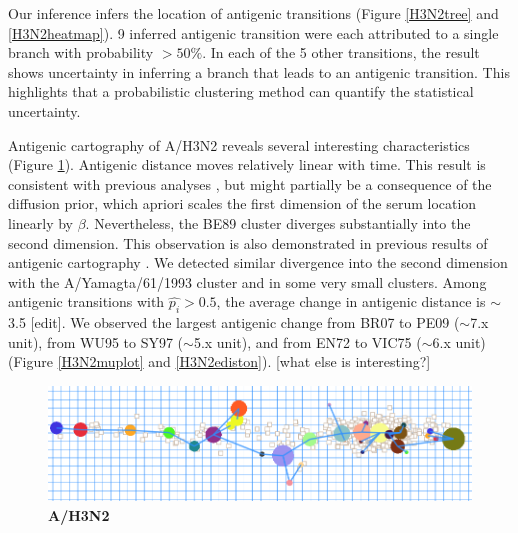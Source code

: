\documentclass[11pt,oneside,letterpaper]{article}
\begin{document}
Our inference infers the location of antigenic transitions (Figure \ref{H3N2tree} and \ref{H3N2heatmap}). 
9 inferred antigenic transition were each attributed to a single branch with probability $>50\%$. In each of the 5 other transitions, the result shows uncertainty in inferring a branch that leads to an antigenic transition. 
This highlights that a probabilistic clustering method can quantify the statistical uncertainty. %




Antigenic cartography of A/H3N2 reveals several interesting characteristics (Figure \ref{H3N2Euclid}). 
Antigenic distance moves relatively linear with time.  
This result is consistent with previous analyses \cite{smith_mapping_2004, bedford_integrating_2014}, but might partially be a consequence of the diffusion prior, which apriori scales the first dimension of the serum location linearly by $\beta$. 
Nevertheless, the BE89 cluster diverges substantially into the second dimension. This observation is also demonstrated in previous results of antigenic cartography \cite{smith_mapping_2004, bedford_integrating_2014}. 
 We detected similar divergence into the second dimension with the A/Yamagta/61/1993 cluster and in some very small clusters. Among antigenic transitions with $\hat{p_i} > 0.5$, the average change in antigenic distance is $\sim$3.5 [edit]. 
 We observed the largest antigenic change from BR07 to PE09 ($\sim$7.x unit), from WU95 to SY97 ($\sim$5.x unit), and from EN72 to VIC75 ($\sim$6.x unit) (Figure \ref{H3N2muplot} and \ref{H3N2ediston}).
[what else is interesting?]




\begin{figure}[h]
	\centering		
	\includegraphics[width=1\textwidth]{figures/custom/H3N2Euclid}
	\caption{\textbf{A/H3N2}
	 		} 
	\label{H3N2Euclid} 
\end{figure}
\end{document}
